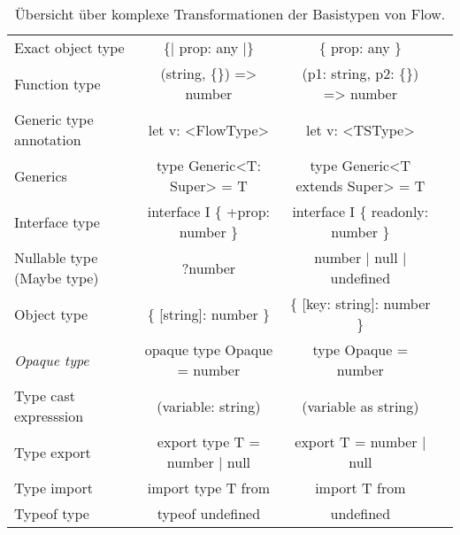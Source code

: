 \begin{table}[tbh]
  \footnotesize
  \begin{tabu} to 
    \midrule
         &                &                & {} \\
    \midrule
    Exact object type          & \{| prop: any |\}                &   \{ prop: any \}                      & {} \\
    Function type              & (string, \{\}) => number         &   (p1: string, p2: \{\}) => number     & {} \\
    Generic type annotation    & let v: <{}FlowType>{}            &   let v: <{}TSType>{}                  & {} \\
    Generics                   & type Generic<{}T: Super> = T     &   type Generic<{}T extends Super> = T  & {} \\
    Interface type             & interface I \{ +prop: number \}  &   interface I \{ readonly: number \}   & {} \\
    Nullable type (Maybe type) & ?number                          &   number | null | undefined            & {} \\
    Object type                & \{ {[}string{]}: number \}       &   \{ {[}key: string{]}: number \}      & {} \\
    \textit{Opaque type}       & opaque type Opaque = number      &   type Opaque = number                 & {} \\
    Type cast expresssion      & (variable: string)               &   (variable as string)                 & {} \\
    Type export                & export type T = number | null    &   export T = number | null             & {} \\
    Type import                & import type T from  &   import T from           & {} \\
    Typeof type                & typeof undefined                 &   undefined                            & {} \\
    \midrule
  \end{tabu}
  \caption{Übersicht über komplexe Transformationen der Basistypen von Flow.}
  \label{tab:transformation-base-types-complex}
\end{table}
